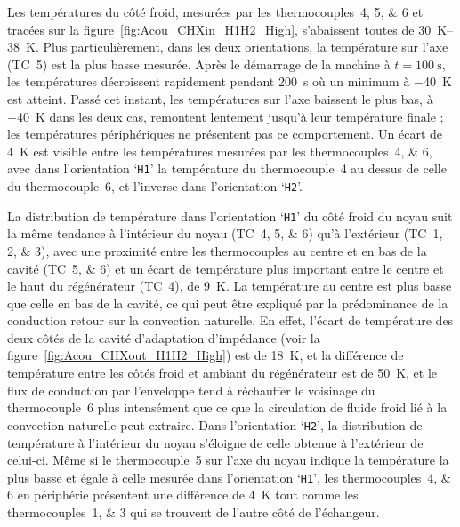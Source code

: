 Les températures du côté froid, mesurées par les thermocouples~\numlist{4;5;6} et tracées sur la figure~\ref{fig:Acou_CHXin_H1H2_High}, s'abaissent toutes de \qtyrange{30}{38}{\kelvin}. Plus particulièrement, dans les deux orientations, la température sur l'axe (TC~\num{5}) est la plus basse mesurée. Après le démarrage de la machine à $t=\qty{100}{\second}$, les températures décroissent rapidement pendant \qty{200}{\second} où un minimum à \qty{-40}{\kelvin} est atteint. Passé cet instant, les températures sur l'axe baissent le plus bas, à \qty{-40}{\kelvin} dans les deux cas, remontent lentement jusqu'à leur température finale ; les températures périphériques  ne présentent pas ce comportement. Un écart de \qty{4}{\kelvin} est visible entre les températures mesurées par les thermocouples~\numlist{4;6}, avec dans l'orientation `\texttt{H1}' la température du thermocouple~\num{4} au dessus de celle du thermocouple~\num{6}, et l'inverse dans l'orientation `\texttt{H2}'.

La distribution de température dans l'orientation `\texttt{H1}' du côté froid du noyau suit la même tendance à l'intérieur du noyau (TC~\numlist{4;5;6}) qu'à l'extérieur (TC~\numlist{1;2;3}), avec une proximité entre les thermocouples au centre et en bas de la cavité (TC~\numlist{5;6}) et un écart de température plus important entre le centre et le haut du régénérateur (TC~\num{4}), de \qty{9}{\kelvin}. La température au centre est plus basse que celle en bas de la cavité, ce qui peut être expliqué par la prédominance de la conduction retour sur la convection naturelle. En effet, l'écart de température des deux côtés de la cavité d'adaptation d'impédance (voir la figure~\ref{fig:Acou_CHXout_H1H2_High}) est de \qty{18}{\kelvin}, et la différence de température entre les côtés froid et ambiant du régénérateur est de \qty{50}{\kelvin}, et le flux de conduction par l'enveloppe tend à réchauffer le voisinage du thermocouple~\num{6} plus intensément que ce que la circulation de fluide froid lié à la convection naturelle peut extraire. Dans l'orientation `\texttt{H2}', la distribution de température à l'intérieur du noyau s'éloigne de celle obtenue à l'extérieur de celui-ci. Même si le thermocouple~\num{5} sur l'axe du noyau indique la température la plus basse et égale à celle mesurée dans l'orientation `\texttt{H1}', les thermocouples~\numlist{4;6} en périphérie présentent une différence de \qty{4}{\kelvin} tout comme les thermocouples~\numlist{1;3} qui se trouvent de l'autre côté de l'échangeur.\medskip

